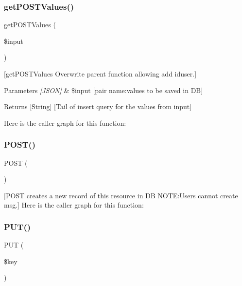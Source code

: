 \subsubsection{\texorpdfstring{get\+P\+O\+S\+T\+Values()}{getPOSTValues()}}
{\footnotesize\ttfamily get\+P\+O\+S\+T\+Values (\begin{DoxyParamCaption}\item[{}]{\$input }\end{DoxyParamCaption})}

\mbox{[}get\+P\+O\+S\+T\+Values Overwrite parent function allowing add iduser.\mbox{]} 
\begin{DoxyParams}{Parameters}
{\em \mbox{[}\+J\+S\+O\+N\mbox{]}} & \$input \mbox{[}pair name\+:values to be saved in DB\mbox{]} \\
\hline
\end{DoxyParams}
\begin{DoxyReturn}{Returns}
\mbox{[}String\mbox{]} \mbox{[}Tail of insert query for the values from input\mbox{]} 
\end{DoxyReturn}
Here is the caller graph for this function\+:
\mbox{\label{class_messages_a2a7e865a6254f6af7005197d30ad1cc0}} 
\subsubsection{\texorpdfstring{P\+O\+S\+T()}{POST()}}
{\footnotesize\ttfamily P\+O\+ST (\begin{DoxyParamCaption}{ }\end{DoxyParamCaption})}

\mbox{[}P\+O\+ST creates a new record of this resource in DB N\+O\+TE\+:Users cannot create msg.\mbox{]} Here is the caller graph for this function\+:
\mbox{\label{class_messages_afc8eb51e951dd8fad1e318be851285ef}} 
\subsubsection{\texorpdfstring{P\+U\+T()}{PUT()}}
{\footnotesize\ttfamily P\+UT (\begin{DoxyParamCaption}\item[{}]{\$key }\end{DoxyParamCaption})}

